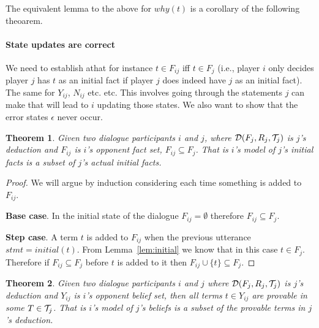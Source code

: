 \documentclass{blue-book}
\newtheorem{theorem}{Theorem}
\newcommand{\deduction}[3]{\ensuremath{{\cal D}(#1, #2, #3)}}
\begin{document}
The equivalent lemma to the above for $why(t)$ is a corollary of the following theoarem.

\paragraph{State updates are correct} We need to establish athat for instance $t \in F_{ij}$ iff $t \in F_j$ (i.e., player $i$ only decides player $j$ has $t$ as an initial fact if player $j$ does indeed have $j$ as an initial fact).  The same for $Y_{ij}$, $N_{ij}$ etc. etc.  This involves going through the statements $j$ can make that will lead to $i$ updating those states.  We also want to show that the error states $\epsilon$ never occur.

\begin{theorem}
Given two dialogue participants $i$ and $j$, where $\deduction{F_j}{R_j}{{\cal T}_j}$ is $j$'s deduction and $F_{ij}$ is $i$'s opponent fact set, $F_{ij} \subseteq F_j$.  That is $i$'s model of $j$'s initial facts is a subset of $j$'s actual initial facts.
\end{theorem}
\begin{proof}
We will argue by induction considering each time something is added to $F_{ij}$.

{\bf Base case}.  In the initial state of the dialogue $F_{ij} = \emptyset$ therefore $F_{ij} \subseteq F_j$.

{\bf Step case}.  A term $t$ is added to $F_{ij}$ when the previous utterance $stmt = initial(t)$.  From Lemma~\ref{lem:initial} we know that in this case $t \in F_j$.  Therefore if $F_{ij} \subseteq F_{j}$ before $t$ is added to it then $F_{ij} \cup \{t\} \subseteq F_{j}$.

\end{proof}
\begin{theorem}
\label{thm:Ycorrect}
Given two dialogue participants $i$ and $j$ where $\deduction{F_j}{R_j}{{\cal T}_j}$ is $j$'s deduction and $Y_{ij}$ is $i$'s opponent belief set, then all terms $t \in Y_{ij}$ are provable in some $T \in {\cal T}_j$.  That is $i$'s model of $j$'s beliefs is a subset of the provable terms in $j$'s deduction.
\end{theorem}
\end{document}

